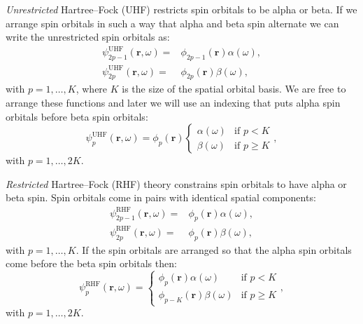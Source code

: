 \documentclass[../Main/chem532-notes.tex]{subfiles}
\begin{document}
\textit{Unrestricted} Hartree--Fock (UHF) restricts spin orbitals to be alpha or beta.
If we arrange spin orbitals in such a way that alpha and beta spin alternate we can write the unrestricted spin orbitals as:
\begin{equation}
\begin{split}
\psi_{2p - 1}^\mathrm{UHF}(\mathbf{r},\omega) 
=& \phi_{2p - 1}(\mathbf{r}) \alpha(\omega),\\
\psi_{2p}^\mathrm{UHF}(\mathbf{r},\omega) 
=& \phi_{2p}(\mathbf{r}) \beta(\omega),
\end{split}
\end{equation}
with $p = 1,\ldots, K$, where $K$ is the size of the spatial orbital basis.
We are free to arrange these functions and later we will use an indexing that puts alpha spin orbitals before beta spin orbitals:
\begin{equation}
\psi_{p}^\mathrm{UHF}(\mathbf{r},\omega)
=\phi_{p}(\mathbf{r})
\begin{cases}
\alpha(\omega) & \text{if } p < K \\
\beta(\omega) & \text{if } p \geq K 
\end{cases},
\end{equation}
with $p = 1,\ldots, 2K$.

\textit{Restricted} Hartree--Fock (RHF) theory constrains spin orbitals to have alpha or beta spin. Spin orbitals come in pairs with identical spatial components:
\begin{equation}
\begin{split}
\psi_{2p - 1}^\mathrm{RHF}(\mathbf{r},\omega) 
=& \phi_{p}(\mathbf{r}) \alpha(\omega),\\
\psi_{2p}^\mathrm{RHF}(\mathbf{r},\omega) 
=& \phi_{p}(\mathbf{r}) \beta(\omega),
\end{split}
\end{equation}
with $p = 1,\ldots, K$.
If the spin orbitals are arranged so that the alpha spin orbitals come before the beta spin orbitals then:
\begin{equation}
\psi_{p}^\mathrm{RHF}(\mathbf{r},\omega)
=
\begin{cases}
\phi_{p}(\mathbf{r}) \alpha(\omega) & \text{if } p < K \\
\phi_{p - K}(\mathbf{r}) \beta(\omega) & \text{if } p \geq K 
\end{cases},
\end{equation}
with $p = 1,\ldots, 2K$.
\end{document}
